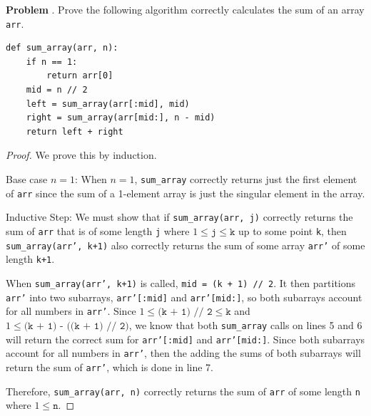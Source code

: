 \documentclass[11pt]{article}
\newcounter{problem}
\newcommand{\problem}[1]{
    \refstepcounter{problem}
    \noindent\textbf{Problem \theproblem}. #1
}
\theoremstyle{claim}
\begin{document}
\pagebreak

\problem{%
    Prove the following algorithm correctly calculates the sum of an array \texttt{arr}.
}
\begin{verbatim}
def sum_array(arr, n):
    if n == 1:
        return arr[0]
    mid = n // 2
    left = sum_array(arr[:mid], mid)
    right = sum_array(arr[mid:], n - mid)
    return left + right
\end{verbatim}

\begin{proof}
We prove this by induction.

Base case \(n = 1\): When \(n = 1\), \texttt{sum\_array} correctly returns just the first element of \texttt{arr} since the sum of a 1-element array is just the singular element in the array.

\vspace{.5em}

Inductive Step: We must show that if \texttt{sum\_array(arr, j)} correctly returns the sum of \texttt{arr} that is of some length \texttt{j} where \(1 \leq \texttt{j} \leq \texttt{k}\) up to some point \texttt{k}, then \texttt{sum\_array(arr', k+1)} also correctly returns the sum of some array \texttt{arr'} of some length \texttt{k+1}.

When \texttt{sum\_array(arr', k+1)} is called, \texttt{mid = (k + 1) // 2}. It then partitions \texttt{arr'} into two subarrays, \texttt{arr'[:mid]} and \texttt{arr'[mid:]}, so both subarrays account for all numbers in \texttt{arr'}. Since \(1 \leq \texttt{(k + 1) // 2} \leq \texttt{k}\) and \(1 \leq \texttt{(k + 1) - ((k + 1) // 2)}\), we know that both \texttt{sum\_array} calls on lines 5 and 6 will return the correct sum for \texttt{arr'[:mid]} and \texttt{arr'[mid:]}. Since both subarrays account for all numbers in \texttt{arr'}, then the adding the sums of both subarrays will return the sum of \texttt{arr'}, which is done in line 7.

Therefore, \texttt{sum\_array(arr, n)} correctly returns the sum of \texttt{arr} of some length \texttt{n} where \(1 \leq \texttt{n}\).

\end{proof}
\end{document}

